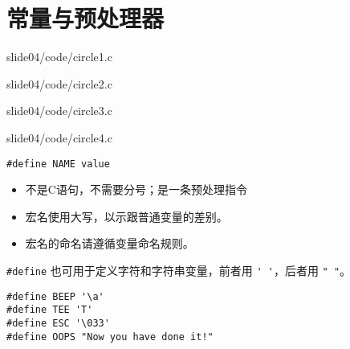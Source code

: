 
\section{常量与预处理器}

\begin{frame}[fragile]\ft{\secname}

{slide04/code/circle1.c}
\end{frame}


\begin{frame}[fragile]\ft{\secname}

{slide04/code/circle2.c}
\end{frame}

\begin{frame}[fragile]\ft{\secname}

{slide04/code/circle3.c}
\end{frame}

\begin{frame}[fragile]\ft{\secname}

{slide04/code/circle4.c}

\end{frame}

\begin{frame}[fragile]
  \begin{free}[宏定义的一般形式]{}
\begin{lstlisting}
#define NAME value
\end{lstlisting}
  \end{free} \pause 

  \begin{free}[注]{}
    \begin{itemize}
    \item 不是C语句，不需要分号；是一条预处理指令\\[0.1in]
    \item 宏名使用大写，以示跟普通变量的差别。\\[0.1in]
    \item 宏名的命名请遵循变量命名规则。
    \end{itemize}
  \end{free} \pause 

  \lstinline|#define| 也可用于定义字符和字符串变量，前者用 \lstinline|' '|，后者用 \lstinline|" "|。

\begin{lstlisting}
#define BEEP '\a'
#define TEE 'T'
#define ESC '\033'
#define OOPS "Now you have done it!"
\end{lstlisting}

\end{frame}

